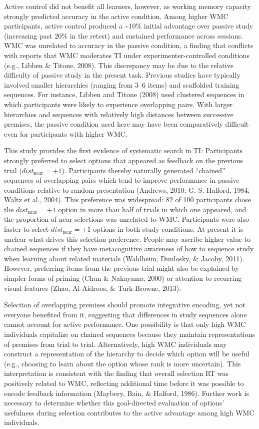 \documentclass[floatsintext,man]{apa6}
\theoremstyle{definition}
\theoremstyle{definition}
\theoremstyle{definition}
\theoremstyle{remark}
\begin{document}
Active control did not benefit all learners, however, as working memory
capacity strongly predicted accuracy in the active condition. Among
higher WMC participants, active control produced a \textasciitilde{}10\%
initial advantage over passive study (increasing past 20\% in the
retest) and sustained performance across sessions. WMC was unrelated to
accuracy in the passive condition, a finding that conflicts with reports
that WMC moderates TI under experimenter-controlled conditions (e.g.,
Libben \& Titone, 2008). This discrepancy may be due to the relative
difficulty of passive study in the present task. Previous studies have
typically involved smaller hierarchies (ranging from 3--6 items) and
scaffolded training sequences. For instance, Libben and Titone (2008)
used clustered sequences in which participants were likely to experience
overlapping pairs. With larger hierarchies and sequences with relatively
high distances between successive premises, the passive condition used
here may have been comparatively difficult even for participants with
higher WMC.

This study provides the first evidence of systematic search in TI:
Participants strongly preferred to select options that appeared as
feedback on the previous trial (\(dist_{\text{near}}=+1\)). Participants
thereby naturally generated \enquote{chained} sequences of overlapping
pairs which tend to improve performance in passive conditions relative
to random presentation (Andrews, 2010; G. S. Halford, 1984; Waltz et
al., 2004). This preference was widespread: 82 of 100 participants chose
the \(dist_{\text{near}}=+1\) option in more than half of trials in
which one appeared, and the proportion of near selections was unrelated
to WMC. Participants were also faster to select
\(dist_{\text{near}}=+1\) options in both study conditions. At present
it is unclear what drives this selection preference. People may ascribe
higher value to chained sequences if they have metacognitive awareness
of how to sequence study when learning about related materials
(Wahlheim, Dunlosky, \& Jacoby, 2011). However, preferring items from
the previous trial might also be explained by simpler forms of priming
(Chun \& Nakayama, 2000) or attention to recurring visual features
(Zhao, Al-Aidroos, \& Turk-Browne, 2013).

Selection of overlapping premises should promote integrative encoding,
yet not everyone benefited from it, suggesting that differences in study
sequences alone cannot account for active performance. One possibility
is that only high WMC individuals capitalize on chained sequences
because they maintain representations of premises from trial to trial.
Alternatively, high WMC individuals may construct a representation of
the hierarchy to decide which option will be useful (e.g., choosing to
learn about the option whose rank is more uncertain). This
interpretation is consistent with the finding that overall selection RT
was positively related to WMC, reflecting additional time before it was
possible to encode feedback information (Maybery, Bain, \& Halford,
1986). Further work is necessary to determine whether this goal-directed
evaluation of options' usefulness during selection contributes to the
active advantage among high WMC individuals.
\end{document}
